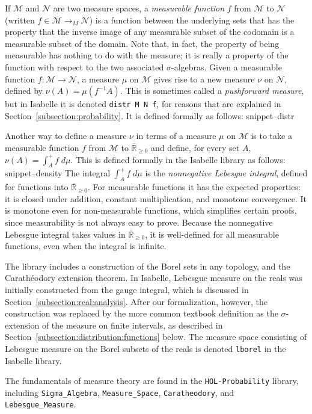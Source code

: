 \documentclass{svjour3}
\newcommand{\ennRR}{\overline{\mathbb{R}}_{\ge 0}}
\newcommand{\mdl}[1]{{\mathcal #1}} %
\newcommand{\Snippet}[1]{\csname snippet--#1\endcsname}
\begin{document}
If $\mdl M$ and $\mdl N$ are two measure spaces, a \emph{measurable function} $f$ from $\mdl M$ to $\mdl N$ (written $f \in \mdl{M} \rightarrow_M \mdl{N}$) is a function between the underlying sets that has the property that the inverse image of any measurable subset of the codomain is a measurable subset of the domain. Note that, in fact, the property of being measurable has nothing to do with the measure; it is really a property of the function with respect to the two associated $\sigma$-algebras. Given a measurable function $f : \mdl M \to \mdl N$, a measure $\mu$ on $\mdl M$ gives rise to a new measure $\nu$ on $\mdl N$, defined by $\nu(A) = \mu(f^{-1} A)$. This is sometimes called a \emph{pushforward measure}, but in Isabelle it is denoted \texttt{distr M N f}, for reasons that are explained in Section~\ref{subsection:probability}. It is defined formally as follows:
\Snippet{distr}

Another way to define a measure $\nu$ in terms of a measure $\mu$ on $\mdl M$ is to take a measurable function $f$ from $\mdl M$ to $\ennRR$ and define, for every set $A$, $\nu(A) = \int_A^+ f \; d\mu$. This is defined formally in the Isabelle library as follows:
\Snippet{density}
The integral $\int_A^+ f \; d\mu$ is the \emph{nonnegative Lebesgue integral}, defined for functions into $\ennRR$. For measurable functions it has the expected properties: it is closed under addition, constant multiplication, and monotone convergence. It is monotone even for non-measurable functions, which simplifies certain proofs, since measurability is not always easy to prove. Because the nonnegative Lebesgue integral takes values in $\ennRR$, it is well-defined for all measurable functions, even when the integral is infinite.

The library includes a construction of the Borel sets in any topology, and the Carath\'eodory extension theorem. In Isabelle, Lebesgue measure on the reals was initially constructed from the gauge integral, which is discussed in Section~\ref{subsection:real:analysis}. After our formalization, however, the construction was replaced by the more common textbook definition as the $\sigma$-extension of the measure on finite intervals, as described in Section~\ref{subsection:distribution:functions} below. The measure space consisting of Lebesgue measure on the Borel subsets of the reals is denoted \texttt{lborel} in the Isabelle library.

The fundamentals of measure theory are found in the \texttt{HOL-Probability} library, including \texttt{Sigma\_Algebra}, \texttt{Measure\_Space}, \texttt{Caratheodory}, and \texttt{Lebesgue\_Measure}.
\end{document}

